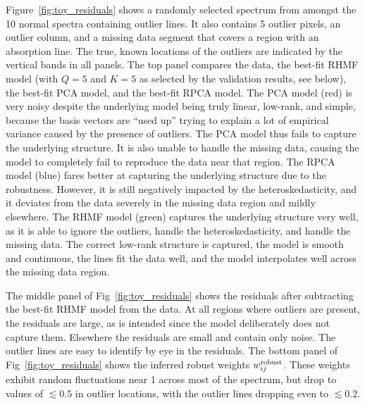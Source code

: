 \documentclass[onecolumn,floatfix]{aastex631}
\begin{document}
Figure~\ref{fig:toy_residuals} shows a randomly selected spectrum from amongst the 10 normal spectra containing outlier lines.
It also contains 5 outlier pixels, an outlier column, and a missing data segment that covers a region with an absorption line.
The true, known locations of the outliers are indicated by the vertical bands in all panels.
The top panel compares the data, the best-fit RHMF model (with $Q=5$ and $K=5$ as selected by the validation results, see below), the best-fit PCA model, and the best-fit RPCA model.
The PCA model (red) is very noisy despite the underlying model being truly linear, low-rank, and simple, because the basis vectors are ``used up'' trying to explain a lot of empirical variance caused by the presence of outliers.
The PCA model thus fails to capture the underlying structure.
It is also unable to handle the missing data, causing the model to completely fail to reproduce the data near that region. 
The RPCA model (blue) fares better at capturing the underlying structure due to the robustness.
However, it is still negatively impacted by the heteroskedasticity, and it deviates from the data severely in the missing data region and mildly elsewhere.
The RHMF model (green) captures the underlying structure very well, as it is able to ignore the outliers, handle the heteroskedasticity, and handle the missing data.
The correct low-rank structure is captured, the model is smooth and continuous, the lines fit the data well, and the model interpolates well across the missing data region.

The middle panel of Fig~\ref{fig:toy_residuals} shows the residuals after subtracting the best-fit RHMF model from the data.
At all regions where outliers are present, the residuals are large, as is intended since the model deliberately does not capture them.
Elsewhere the residuals are small and contain only noise.
The outlier lines are easy to identify by eye in the residuals.
The bottom panel of Fig~\ref{fig:toy_residuals} shows the inferred robust weights $w_{ij}^{\rm robust}$.
These weights exhibit random fluctuations near 1 across most of the spectrum, but drop to values of $\lesssim 0.5$ in outlier locations, with the outlier lines dropping even to $\lesssim 0.2$.
\end{document}
